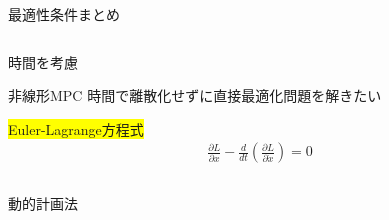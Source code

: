 \documentclass[twocolumn, dvipdfmx,12pt]{beamer}
\begin{document}
\begin{frame}{最適性条件まとめ}
\begin{columns}
            \begin{column}{.55\textwidth}
                \begin{itembox}[l]{時間を考慮}
                    \begin{itembox}[l]{非線形MPC}
                        時間で離散化せずに直接最適化問題を解きたい
                    \end{itembox}
                    \colorbox{yellow}{Euler-Lagrange方程式}\\
                    \begin{align*}
                        \frac{\partial L}{\partial x} - \frac{d}{dt} \left( \frac{\partial L}{\partial \dot{x}} \right) = 0
                    \end{align*}
                    \begin{columns}
                        \begin{column}{.5\textwidth}
                            \begin{center}
                                \begin{itembox}[l]{動的計画法}
                                \end{itembox}
                            \end{center}
                        \end{column}
                        \begin{column}{.5\textwidth}
                        \end{column}
                    \end{columns}
                    
                \end{itembox}
            \end{column}
        \end{columns}
    \end{frame}
\end{document}

